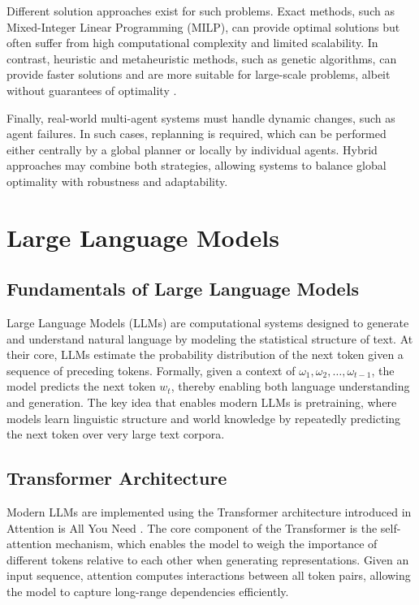 Different solution approaches exist for such problems. 
Exact methods, such as Mixed-Integer Linear Programming (MILP), can provide optimal solutions but often suffer from high computational complexity and limited scalability. 
In contrast, heuristic and metaheuristic methods, such as genetic algorithms, can provide faster solutions and are more suitable for large-scale problems, 
albeit without guarantees of optimality \cite{bektas2006mtsp}.

Finally, real-world multi-agent systems must handle dynamic changes, such as agent failures. 
In such cases, replanning is required, which can be performed either centrally by a global planner or locally by individual agents. 
Hybrid approaches may combine both strategies, allowing systems to balance global optimality with robustness and adaptability.

\section{Large Language Models}

\subsection{Fundamentals of Large Language Models}
Large Language Models (LLMs) are computational systems designed to generate and understand natural language by modeling the statistical structure of text.
At their core, LLMs estimate the probability distribution of the next token given a sequence of preceding tokens.
Formally, given a context of $\omega_1, \omega_2, \dots, \omega_{t-1}$, the model predicts the next token $w_t$, thereby enabling both language understanding and generation.
The key idea that enables modern LLMs is pretraining, 
where models learn linguistic structure and world knowledge by repeatedly predicting the next token over very large text corpora.

\subsection{Transformer Architecture}
Modern LLMs are implemented using the Transformer architecture introduced in Attention is All You Need \cite{vaswani2017attention}.
The core component of the Transformer is the self-attention mechanism, 
which enables the model to weigh the importance of different tokens relative to each other when generating representations. 
Given an input sequence, attention computes interactions between all token pairs, allowing the model to capture long-range dependencies efficiently.

